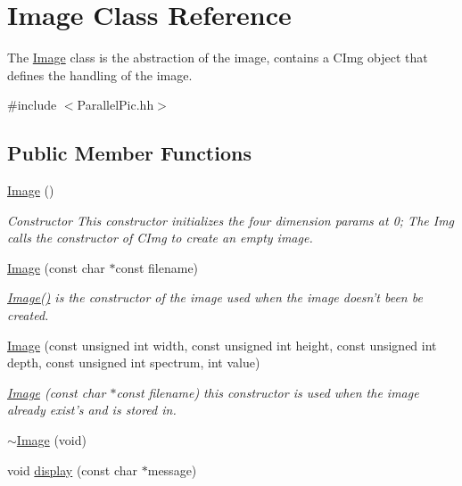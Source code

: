 \hypertarget{class_image}{\section{Image Class Reference}
\label{class_image}
}


The \hyperlink{class_image}{Image} class is the abstraction of the image, contains a C\-Img object that defines the handling of the image.  




{\ttfamily \#include $<$Parallel\-Pic.\-hh$>$}

\subsection*{Public Member Functions}
\begin{DoxyCompactItemize}
\item 
\hyperlink{class_image_a58edd1c45b4faeb5f789b0d036d02313}{Image} ()
\begin{DoxyCompactList}\small\item\em Constructor This constructor initializes the four dimension params at 0; The Img calls the constructor of C\-Img to create an empty image. \end{DoxyCompactList}\item 
\hyperlink{class_image_a54de984d18843789d938f7328bdea800}{Image} (const char $\ast$const filename)
\begin{DoxyCompactList}\small\item\em \hyperlink{class_image_a58edd1c45b4faeb5f789b0d036d02313}{Image()} is the constructor of the image used when the image doesn't been be created. \end{DoxyCompactList}\item 
\hyperlink{class_image_a2055dfd9700ce01e4f5b06f75b5f0fab}{Image} (const unsigned int width, const unsigned int height, const unsigned int depth, const unsigned int spectrum, int value)
\begin{DoxyCompactList}\small\item\em \hyperlink{class_image}{Image} (const char $\ast$const filename) this constructor is used when the image already exist's and is stored in. \end{DoxyCompactList}\item 
\hyperlink{class_image_a794ae7f8ff9b4b7b7306343ac2f56356}{$\sim$\-Image} (void)
\item 
void \hyperlink{class_image_a62ff76610f4f6ed2817d7f60abda765f}{display} (const char $\ast$message)

\end{DoxyCompactItemize}
